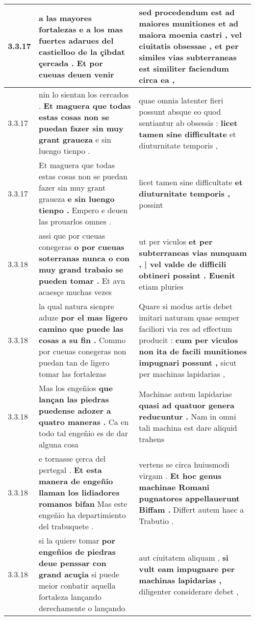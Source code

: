 \begin{tabular}{|p{1cm}|p{6.5cm}|p{6.5cm}|}
3.3.17 & a las mayores fortalezas \textbf{ e a los mas fuertes adarues del castielloo de la çibdat çercada . } Et por cueuas deuen venir & sed procedendum est \textbf{ ad maiores munitiones et ad maiora moenia castri , vel ciuitatis obsessae , } et per similes vias subterraneas est similiter faciendum circa ea , \\\hline
3.3.17 & nin lo sientan los cercados . \textbf{ Et maguera que todas estas cosas non se puedan fazer sin muy grant graueza } e sin luengo tienpo . & quae omnia latenter fieri possunt absque eo quod sentiantur ab obsessis : \textbf{ licet tamen sine difficultate } et diuturnitate temporis , \\\hline
3.3.17 & Et maguera que todas estas cosas non se puedan fazer sin muy grant graueza \textbf{ e sin luengo tienpo . } Empero e deuen las prouarlos omnes . & licet tamen sine difficultate \textbf{ et diuturnitate temporis , } possint \\\hline
3.3.18 & assi que por cueuas conegeras \textbf{ o por cueuas soterranas nunca o con muy grand trabaio se pueden tomar . } Et avn acaesçe muchas vezes & ut per viculos \textbf{ et per subterraneas vias nunquam , | vel valde de difficili obtineri possint . Euenit } etiam pluries \\\hline
3.3.18 & la qual natura sienpre aduze \textbf{ por el mas ligero camino que puede las cosas a su fin . } Commo por cueuas conegeras non puedan tan de ligero tomar las fortalezas & Quare si modus artis debet imitari naturam quae semper faciliori via res ad effectum producit : \textbf{ cum per viculos non ita de facili munitiones impugnari possunt , } sicut per machinas lapidarias , \\\hline
3.3.18 & Mas los engeñios \textbf{ que lançan las piedras puedense adozer a quatro maneras . } Ca en todo tal engeñio es de dar alguna cosa & Machinae autem lapidariae \textbf{ quasi ad quatuor genera reducuntur . } Nam in omni tali machina est dare aliquid trahens \\\hline
3.3.18 & e tornasse çerca del pertegal . \textbf{ Et esta manera de engeñio llaman los lidiadores romanos bifan } Mas este engeñio ha departimiento del trabuquete . & vertens se circa huiusmodi virgam . \textbf{ Et hoc genus machinae Romani pugnatores appellauerunt Biffam . } Differt autem haec a Trabutio . \\\hline
3.3.18 & si la quiere tomar \textbf{ por engeñios de piedras deue penssar con grand acuçia } si puede meior conbatir aquella fortaleza lançando derechamente o lançando & aut ciuitatem aliquam , \textbf{ si vult eam impugnare per machinas lapidarias , } diligenter considerare debet , \\\hline

\end{tabular}
